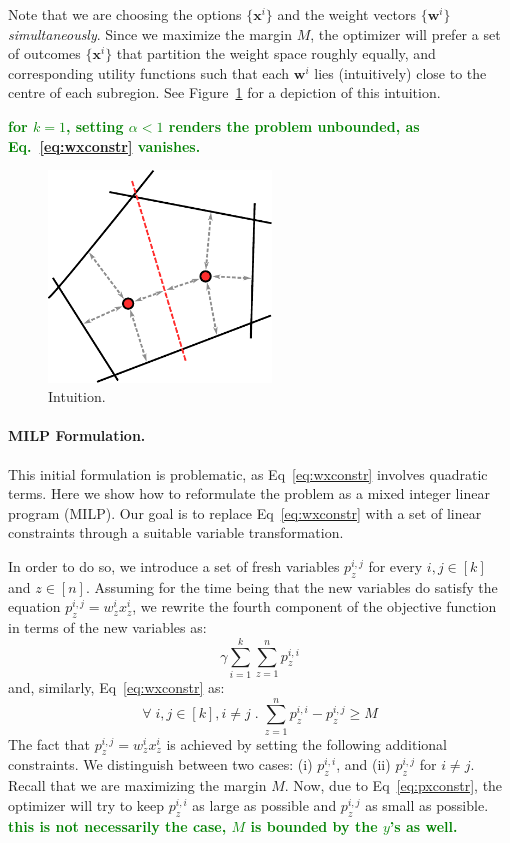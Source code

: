\documentclass{article}
\renewcommand\[{\begin{equation}}
\renewcommand\]{\end{equation}}
\newcommand{\vecvar}[1]{\ensuremath{\boldsymbol{#1}}}
\newcommand{\vw}{\vecvar{w}}
\newcommand{\vx}{\vecvar{x}}
\newcommand{\stefano}[1]{{\bf \textcolor{green}{{\fbox{Stefano:} #1}}}}
\begin{document}
Note that we are choosing the options $\{ \vx^i \}$ and the weight vectors $\{
\vw^i \}$ {\em simultaneously}. Since we maximize the margin $M$, the optimizer
will prefer a set of outcomes $\{ \vx^{i} \}$ that partition the weight space
roughly equally, and corresponding utility functions such that each $\vw^{i}$
lies (intuitively) close to the centre of each subregion. See
Figure~\ref{fig:setmargin} for a depiction of this intuition.

\stefano{for $k=1$, setting $\alpha < 1$  renders the problem unbounded, as
Eq.~\ref{eq:wxconstr} vanishes.}

\begin{figure}[t]
    \begin{center}
        \includegraphics[width=16em]{figures/setmargin}
    \end{center}
    \caption{\label{fig:setmargin} Intuition.}
\end{figure}

\paragraph{MILP Formulation.} This initial formulation is problematic, as
Eq~\ref{eq:wxconstr} involves quadratic terms. Here we show how to reformulate
the problem as a mixed integer linear program (MILP). Our goal is to replace
Eq~\ref{eq:wxconstr} with a set of linear constraints through a suitable
variable transformation.

In order to do so, we introduce a set of fresh variables $p^{i,j}_z$ for every
$i,j\in[k]$ and $z\in[n]$. Assuming for the time being that the new variables
do satisfy the equation $p^{i,j}_z = w^i_z x^i_z$, we rewrite the fourth
component of the objective function in terms of the new variables as:
%
$$ \gamma \sum_{i=1}^k \sum_{z=1}^n p^{i,i}_z $$
%
and, similarly, Eq~\ref{eq:wxconstr} as:
%
\[ \forall \; i, j \in [k], i \neq j \;.\; \sum_{z=1}^n p^{i,i}_z - p^{i,j}_z \ge M \label{eq:pxconstr} \]
%
The fact that $p^{i,j}_z = w^{i}_z x^{i}_z$ is achieved by
setting the following additional constraints. We distinguish between two cases:
(i) $p^{i,i}_z$, and (ii) $p^{i,j}_z$ for $i \ne j$.  Recall that we are
maximizing the margin $M$. Now, due to Eq~\ref{eq:pxconstr}, the optimizer will
try to keep $p^{i,i}_z$ as large as possible and $p^{i,j}_z$ as small as
possible. \stefano{this is not necessarily the case, $M$ is bounded by the
$y$'s as well.}
\end{document}
